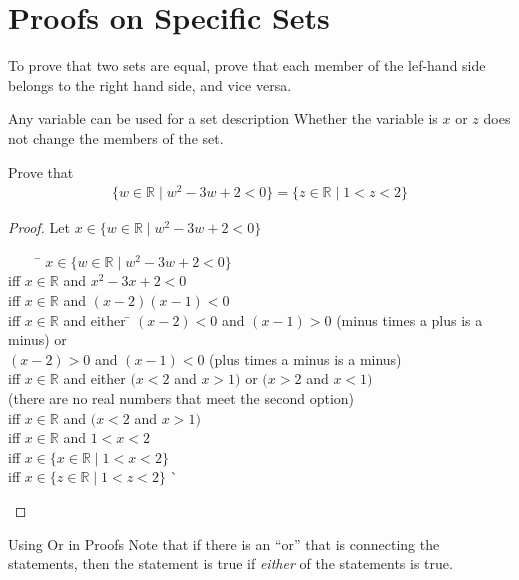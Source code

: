 \documentclass[../notes.tex]{subfiles}
\begin{document}
		\section{Proofs on Specific Sets}
			To prove that two sets are equal, prove that each member of the lef-hand side belongs to the right hand side, and vice versa.
			\begin{sidenote}{Any variable can be used for a set description}
				Whether the variable is $x$ or $z$ does not change the members of the set.
			\end{sidenote}
			\begin{example}
				Prove that
				\begin{align*}
					\{w \in \mathbb{R} \mid w^{2} - 3w + 2 < 0\} = \{z \in \mathbb{R} \mid 1 < z < 2\}
				\end{align*}
				\begin{proof}
					Let $x \in \{w \in \mathbb{R} \mid w^{2} - 3w + 2 < 0\}$
					\begin{tabbing}
						$\qquad$ \= $x \in \{w \in \mathbb{R} \mid w^{2} - 3w + 2 < 0\}$\\
						iff      \> $x \in \mathbb{R}$ and $x^{2} - 3x + 2 < 0$\\
						iff      \> $x \in \mathbb{R}$ and $(x - 2)(x - 1) < 0$\\
						iff      \> $x \in \mathbb{R}$ and either \= $(x - 2) < 0$ and $(x - 1) > 0$ (minus times a plus is a minus) or\\
						         \>                               \> $(x - 2) > 0$ and $(x - 1) < 0$ (plus times a minus is a minus)\\
						iff      \> $x \in \mathbb{R}$ and either \> $(x < 2$ and $x > 1)$ or $(x > 2$ and $x < 1)$\\
										 \>                               \> (there are no real numbers that meet the second option)\\
						iff      \> $x \in \mathbb{R}$ and $(x < 2$ and $x > 1)$\\
						iff      \> $x \in \mathbb{R}$ and $1 < x < 2$\\
						iff      \> $x \in \{x \in \mathbb{R} \mid 1 < x < 2\}$\\
						iff      \> $x \in \{z \in \mathbb{R} \mid 1 < z < 2\}$ \` \qedhere
					\end{tabbing}
				\end{proof}
			\end{example}
			\begin{sidenote}{Using Or in Proofs}
				Note that if there is an ``or'' that is connecting the statements, then the statement is true if \textit{either} of the statements is true.
			\end{sidenote}
\end{document}
